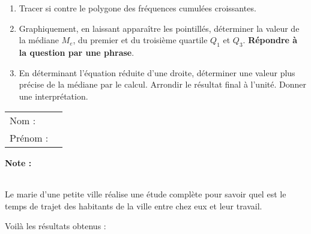 \documentclass[10pt,french]{book}
\newcommand\presentation{
\setcounter{exo}{0}
    \begin{tabular}{ll}
        Nom : \\[5pt]
        Prénom :
    \end{tabular}
\hfill
    \textbf{Note :}
        \renewcommand\arraystretch{2.3}
    \begin{tabular}{|c|}
        \hline
            \slashbox{\Huge\bfseries\phantom{10}}{\Huge\bfseries 10}\\
        \hline
    \end{tabular}
        \renewcommand\arraystretch{1.5}\par\bigskip
    \hrulefill\par\vspace{1cm}
}
\begin{document}
\begin{enumerate}[resume]
    \item Tracer si contre le polygone des fréquences cumulées croissantes.
    \item Graphiquement, en laissant apparaître les pointillés, déterminer la valeur de la médiane $M_e$, du premier et du troisième quartile $Q_1$ et $Q_3$. \textbf{Répondre à la question par une phrase}.
    \item En déterminant l'équation réduite d'une droite, déterminer une valeur plus précise de la médiane par le calcul. Arrondir le résultat final à l'unité. Donner une interprétation.
\end{enumerate}

\clearpage

\begin{center}
\end{center}\clearpage


\presentation

Le marie d'une petite ville réalise une étude complète pour savoir quel est le temps de trajet des habitants de la ville entre chez eux et leur travail.\par Voilà les résultats obtenus :
\end{document}
